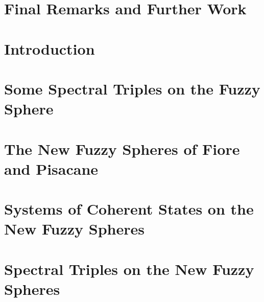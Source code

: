 \documentclass[12pt]{report}
\theoremstyle{definition}
\begin{document}
\chapter*{Final Remarks and Further Work}
 \label{chp:remarks}

\setcounter{chapter}{-1}
\chapter{Introduction}\label{chp:intro}


\chapter{Some Spectral Triples on the Fuzzy Sphere}\label{chp:fuzzysphere}


\chapter{The New Fuzzy Spheres of Fiore and Pisacane}\label{chp:NewFuzzy}


\chapter{Systems of Coherent States on the New Fuzzy Spheres}\label{chp:CHNew}


\chapter{Spectral Triples on the New Fuzzy Spheres}\label{chp:NewDistance}




\printbibliography
\end{document}
